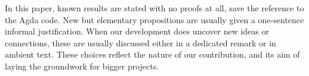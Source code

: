In this paper, known results are stated with no proofs at all, save the reference to the Agda code. %
New but elementary propositions are usually given a one-sentence informal justification.
When our development does uncover new ideas or connections,
these are usually discussed either in a dedicated remark or in ambient text.
These choices reflect the nature of our contribution, and its aim of laying the
groundwork for bigger projects.

